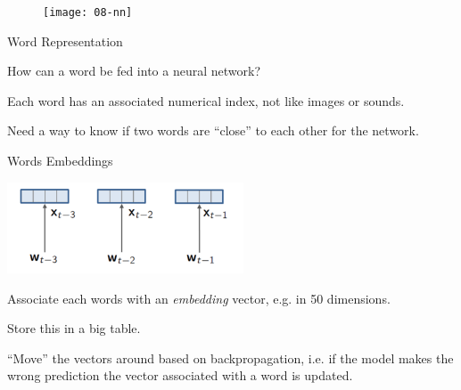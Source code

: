 \documentclass{beamer}
\let\tempone\itemize
\let\temptwo\enditemize
\renewenvironment{itemize}{\tempone\addtolength{\itemsep}{0.5\baselineskip}}{\temptwo}
\begin{document}
\begin{frame}
    \begin{figure}
    \centering
    \texttt{[image: 08-nn]}
    \end{figure}
\end{frame}


\begin{frame}{Word Representation}
  \begin{itemize}
  \item How can a word be fed into a neural network?

  \item Each word has an associated numerical index, not like images or 
    sounds.

  \item Need a way to know if two words are ``close'' to each other 
    for the network. 
  \end{itemize}

\end{frame}


\begin{frame}{Words Embeddings}
  \begin{center}
    \includegraphics[width=7cm]{emb}
  \end{center}
  \begin{itemize}
  \item Associate each words with an \textit{embedding} vector, e.g. in 50 dimensions. 
  \item Store this in a big table. 
  \item ``Move'' the vectors around based on backpropagation, i.e. if the model 
    makes the wrong prediction the vector associated with a word is updated.
  \end{itemize}
\end{frame}



  

\end{document}
